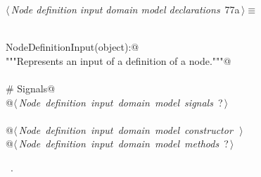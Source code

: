 \documentclass[
    a4paper,      %
    10pt,         %
    openright,    %
    notitlepage,  %
    parskip=half, %
]{scrreprt}       %
\theoremstyle{definition}                    %
\begin{document}
\begin{flushleft} \small
\begin{minipage}{\linewidth}\label{scrap124}\raggedright\small
{} $\langle\,${\itshape Node definition input domain model declarations}\nobreak\ {\footnotesize {77a}}$\,\rangle\equiv$
\vspace{-1exm}
\begin{list}{}{} \item
\mbox{}\lstinline@@\\
\mbox{}\lstinline@class NodeDefinitionInput(object):@\\
\mbox{}\lstinline@    """Represents an input of a definition of a node."""@\\
\mbox{}\lstinline@@\\
\mbox{}\lstinline@    # Signals@\\
\mbox{}\lstinline@    @\hbox{$\langle\,${\itshape Node definition input domain model signals}\nobreak\ {\footnotesize ?}$\,\rangle$}\lstinline@@\\
\mbox{}\lstinline@@\\
\mbox{}\lstinline@    @\hbox{$\langle\,${\itshape Node definition input domain model constructor}\nobreak\ {\footnotesize {}}$\,\rangle$}\lstinline@@\\
\mbox{}\lstinline@    @\hbox{$\langle\,${\itshape Node definition input domain model methods}\nobreak\ {\footnotesize ?}$\,\rangle$}\lstinline@@{\NWsep}
\end{list}
\vspace{-1.5ex}
\footnotesize
\begin{list}{}{\setlength{\itemsep}{-\parsep}\setlength{\itemindent}{-\leftmargin}}
\item \NWtxtMacroRefIn\ .

\item{}
\end{list}
\end{minipage}\vspace{4ex}
\end{flushleft}
\end{document}
